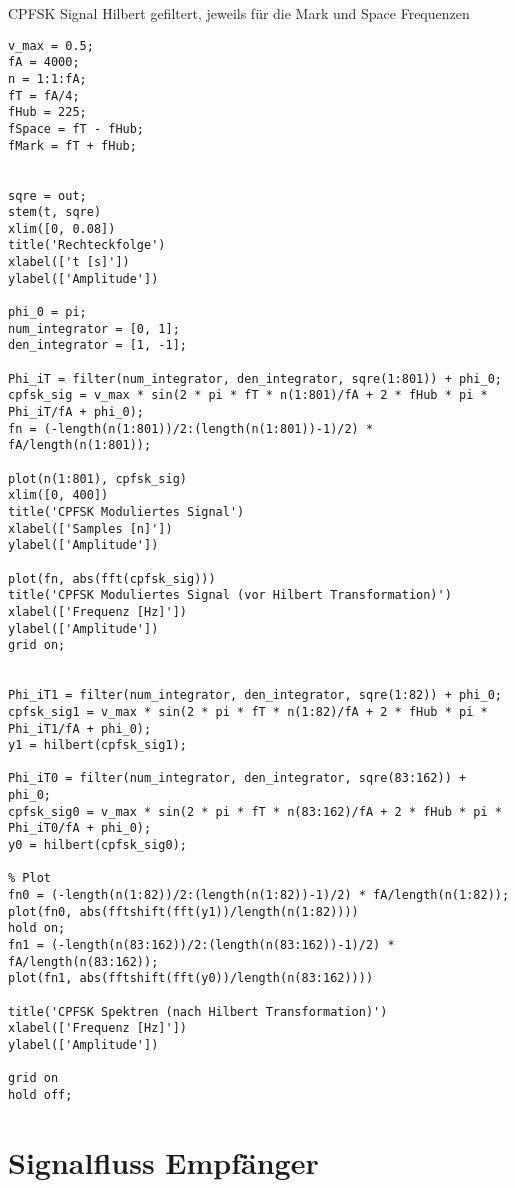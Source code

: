 \documentclass{article}
\begin{document}
\begin{listing}\label{codeM:hilbert}
    \caption{CPFSK Signal Hilbert gefiltert, jeweils für die Mark und Space Frequenzen}
    \begin{verbatim}
v_max = 0.5;
fA = 4000;
n = 1:1:fA;
fT = fA/4;
fHub = 225;
fSpace = fT - fHub;
fMark = fT + fHub;


sqre = out;
stem(t, sqre)
xlim([0, 0.08])
title('Rechteckfolge')
xlabel(['t [s]'])
ylabel(['Amplitude'])

phi_0 = pi;
num_integrator = [0, 1];
den_integrator = [1, -1];

Phi_iT = filter(num_integrator, den_integrator, sqre(1:801)) + phi_0;
cpfsk_sig = v_max * sin(2 * pi * fT * n(1:801)/fA + 2 * fHub * pi * Phi_iT/fA + phi_0);
fn = (-length(n(1:801))/2:(length(n(1:801))-1)/2) * fA/length(n(1:801));

plot(n(1:801), cpfsk_sig)
xlim([0, 400])
title('CPFSK Moduliertes Signal')
xlabel(['Samples [n]'])
ylabel(['Amplitude'])

plot(fn, abs(fft(cpfsk_sig)))
title('CPFSK Moduliertes Signal (vor Hilbert Transformation)')
xlabel(['Frequenz [Hz]'])
ylabel(['Amplitude'])
grid on;


Phi_iT1 = filter(num_integrator, den_integrator, sqre(1:82)) + phi_0;
cpfsk_sig1 = v_max * sin(2 * pi * fT * n(1:82)/fA + 2 * fHub * pi * Phi_iT1/fA + phi_0);
y1 = hilbert(cpfsk_sig1);

Phi_iT0 = filter(num_integrator, den_integrator, sqre(83:162)) + phi_0;
cpfsk_sig0 = v_max * sin(2 * pi * fT * n(83:162)/fA + 2 * fHub * pi * Phi_iT0/fA + phi_0);
y0 = hilbert(cpfsk_sig0);

% Plot
fn0 = (-length(n(1:82))/2:(length(n(1:82))-1)/2) * fA/length(n(1:82));
plot(fn0, abs(fftshift(fft(y1))/length(n(1:82))))
hold on;
fn1 = (-length(n(83:162))/2:(length(n(83:162))-1)/2) * fA/length(n(83:162));
plot(fn1, abs(fftshift(fft(y0))/length(n(83:162))))

title('CPFSK Spektren (nach Hilbert Transformation)')
xlabel(['Frequenz [Hz]'])
ylabel(['Amplitude'])

grid on
hold off;
    \end{verbatim}
\end{listing}




\section{Signalfluss Empfänger}
\end{document}
